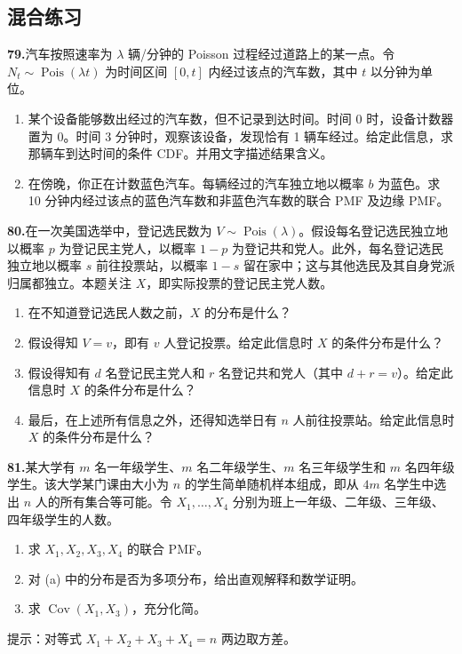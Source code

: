 \documentclass[UTF8, 12pt, fontset=fandol, oneside]{ctexart}
\begin{document}
\subsection*{混合练习}

\noindent\textbf{79.}\quad 汽车按照速率为 $\lambda$ 辆/分钟的 Poisson 过程经过道路上的某一点。令 $N_t\sim \operatorname{Pois}(\lambda t)$ 为时间区间 $[0,t]$ 内经过该点的汽车数，其中 $t$ 以分钟为单位。
\begin{enumerate}
  \item[(a)] 某个设备能够数出经过的汽车数，但不记录到达时间。时间 $0$ 时，设备计数器置为 $0$。时间 3 分钟时，观察该设备，发现恰有 1 辆车经过。给定此信息，求那辆车到达时间的条件 CDF。并用文字描述结果含义。
  \item[(b)] 在傍晚，你正在计数蓝色汽车。每辆经过的汽车独立地以概率 $b$ 为蓝色。求 10 分钟内经过该点的蓝色汽车数和非蓝色汽车数的联合 PMF 及边缘 PMF。
\end{enumerate}

\noindent\textbf{80.}\quad 在一次美国选举中，登记选民数为 $V\sim \operatorname{Pois}(\lambda)$。假设每名登记选民独立地以概率 $p$ 为登记民主党人，以概率 $1-p$ 为登记共和党人。此外，每名登记选民独立地以概率 $s$ 前往投票站，以概率 $1-s$ 留在家中；这与其他选民及其自身党派归属都独立。本题关注 $X$，即实际投票的登记民主党人数。
\begin{enumerate}
  \item[(a)] 在不知道登记选民人数之前，$X$ 的分布是什么？
  \item[(b)] 假设得知 $V=v$，即有 $v$ 人登记投票。给定此信息时 $X$ 的条件分布是什么？
  \item[(c)] 假设得知有 $d$ 名登记民主党人和 $r$ 名登记共和党人（其中 $d+r=v$）。给定此信息时 $X$ 的条件分布是什么？
  \item[(d)] 最后，在上述所有信息之外，还得知选举日有 $n$ 人前往投票站。给定此信息时 $X$ 的条件分布是什么？
\end{enumerate}

\noindent\textbf{81.}\quad 某大学有 $m$ 名一年级学生、$m$ 名二年级学生、$m$ 名三年级学生和 $m$ 名四年级学生。该大学某门课由大小为 $n$ 的学生简单随机样本组成，即从 $4m$ 名学生中选出 $n$ 人的所有集合等可能。令 $X_1,\ldots,X_4$ 分别为班上一年级、二年级、三年级、四年级学生的人数。
\begin{enumerate}
  \item[(a)] 求 $X_1,X_2,X_3,X_4$ 的联合 PMF。
  \item[(b)] 对 (a) 中的分布是否为多项分布，给出直观解释和数学证明。
  \item[(c)] 求 $\operatorname{Cov}(X_1,X_3)$，充分化简。
\end{enumerate}
提示：对等式 $X_1+X_2+X_3+X_4=n$ 两边取方差。
\end{document}
